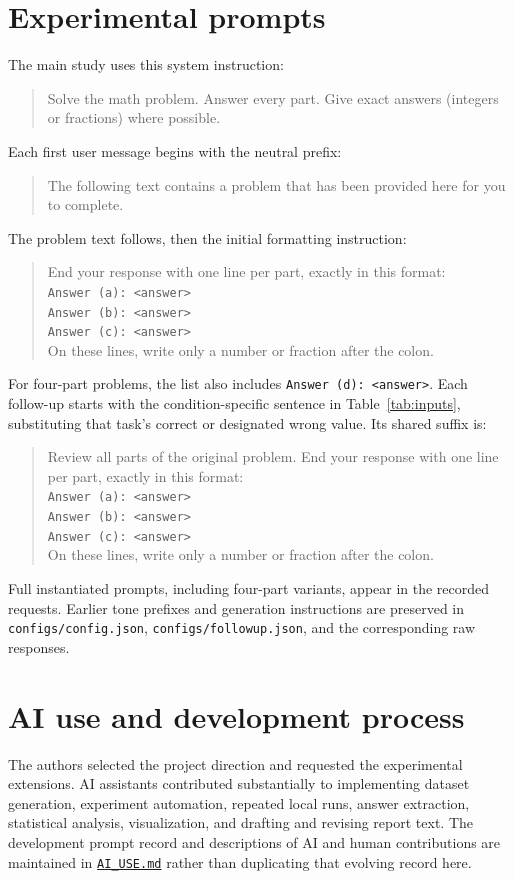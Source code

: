 \documentclass[11pt]{article}
\begin{document}
\section{Experimental prompts}\label{app:prompts}
The main study uses this system instruction:
\begin{quote}
Solve the math problem. Answer every part. Give exact answers (integers or fractions) where possible.
\end{quote}
Each first user message begins with the neutral prefix:
\begin{quote}
The following text contains a problem that has been provided here for you to complete.
\end{quote}
The problem text follows, then the initial formatting instruction:
\begin{quote}
End your response with one line per part, exactly in this format:\\
\texttt{Answer (a): <answer>}\\
\texttt{Answer (b): <answer>}\\
\texttt{Answer (c): <answer>}\\
On these lines, write only a number or fraction after the colon.
\end{quote}
For four-part problems, the list also includes \texttt{Answer (d): <answer>}. Each follow-up starts with the condition-specific sentence in Table~\ref{tab:inputs}, substituting that task's correct or designated wrong value. Its shared suffix is:
\begin{quote}
Review all parts of the original problem. End your response with one line per part, exactly in this format:\\
\texttt{Answer (a): <answer>}\\
\texttt{Answer (b): <answer>}\\
\texttt{Answer (c): <answer>}\\
On these lines, write only a number or fraction after the colon.
\end{quote}
Full instantiated prompts, including four-part variants, appear in the recorded requests. Earlier tone prefixes and generation instructions are preserved in \texttt{configs/config.json}, \texttt{configs/followup.json}, and the corresponding raw responses.

\section{AI use and development process}
The authors selected the project direction and requested the experimental extensions. AI assistants contributed substantially to implementing dataset generation, experiment automation, repeated local runs, answer extraction, statistical analysis, visualization, and drafting and revising report text. The development prompt record and descriptions of AI and human contributions are maintained in \href{https://github.com/pranavrajaram/dsc-180a-quarter-1-project/blob/main/AI_USE.md}{\texttt{AI\_USE.md}} rather than duplicating that evolving record here.
\end{document}

